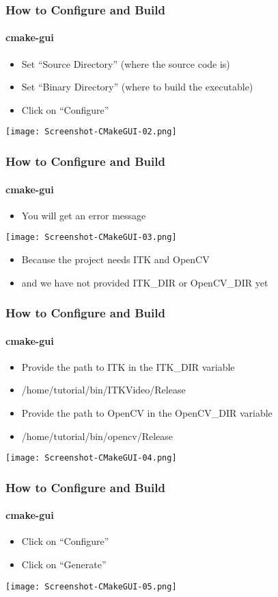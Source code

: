\begin{frame}[fragile]
\frametitle{How to Configure and Build}
\framesubtitle{cmake-gui}
\begin{itemize}
\item Set ``Source Directory'' (where the source code is)
\item Set ``Binary Directory'' (where to build the executable)
\item Click on ``Configure''
\end{itemize}
\begin{center}
  \texttt{[image: Screenshot-CMakeGUI-02.png]}
\end{center}
\end{frame}

\begin{frame}[fragile]
\frametitle{How to Configure and Build}
\framesubtitle{cmake-gui}
\begin{itemize}
\item You will get an error message
\end{itemize}
\begin{center}
  \texttt{[image: Screenshot-CMakeGUI-03.png]}
\end{center}
\begin{itemize}
\item Because the project needs ITK and OpenCV
\item and we have not provided ITK\_DIR or OpenCV\_DIR yet
\end{itemize}
\end{frame}


\begin{frame}[fragile]
\frametitle{How to Configure and Build}
\framesubtitle{cmake-gui}
\begin{itemize}
\item Provide the path to ITK in the ITK\_DIR variable
\item /home/tutorial/bin/ITKVideo/Release
\pause
\item Provide the path to OpenCV in the OpenCV\_DIR variable
\item /home/tutorial/bin/opencv/Release
\end{itemize}
\begin{center}
  \texttt{[image: Screenshot-CMakeGUI-04.png]}
\end{center}
\end{frame}

\begin{frame}[fragile]
\frametitle{How to Configure and Build}
\framesubtitle{cmake-gui}
\begin{itemize}
\item Click on ``Configure''
\item Click on ``Generate''
\end{itemize}
\begin{center}
  \texttt{[image: Screenshot-CMakeGUI-05.png]}
\end{center}
\end{frame}

